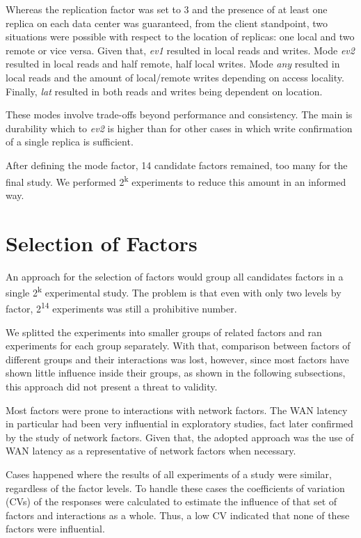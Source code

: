 \documentclass[doublespacing]{bmcart}
\begin{document}
Whereas the replication factor was set to 3 and the presence of at least one replica
on each data center was guaranteed, from the client standpoint, two situations were possible with respect to the location
of replicas: one local and two remote or vice versa. Given that,
\textit{ev1} resulted in local reads and writes. Mode \textit{ev2} resulted in
local reads and half remote, half local writes. Mode \textit{any} resulted in
local reads and the amount of local/remote writes depending on access locality.
Finally, \textit{lat} resulted in both reads and writes being dependent on location.

These modes involve trade-offs beyond performance and consistency. The main is
durability which to \textit{ev2} is higher than for other cases in which write
confirmation of a single replica is sufficient.

After defining the mode factor, 14 candidate factors remained, too many for the final study. We performed 2\textsuperscript{k} experiments to reduce this amount in an informed way.

\section{Selection of Factors}

An approach for the selection of factors would group all candidates factors in a
single 2\textsuperscript{k} experimental study. The problem is that even with
only two levels by factor, 2\textsuperscript{14} experiments was still a prohibitive number.

We splitted the experiments into smaller groups of related factors and
ran experiments for each group separately. With that, comparison between factors of
different groups and their interactions was lost, however, since most factors
have shown little influence inside their groups, as shown in the following
subsections, this approach did not present a threat to validity.

Most factors were prone to interactions with network factors. The WAN latency in
particular had been very influential in exploratory studies, fact later confirmed by
the study of network factors. Given that, the adopted approach was the use of
WAN latency as a representative of network factors when necessary.

Cases happened where the results of all experiments of a study were
similar, regardless of the factor levels. To handle these cases the coefficients
of variation (CVs) of the responses were calculated to estimate the influence of
that set of factors and interactions as a whole. Thus, a low CV indicated that
none of these factors were influential.
\end{document}
